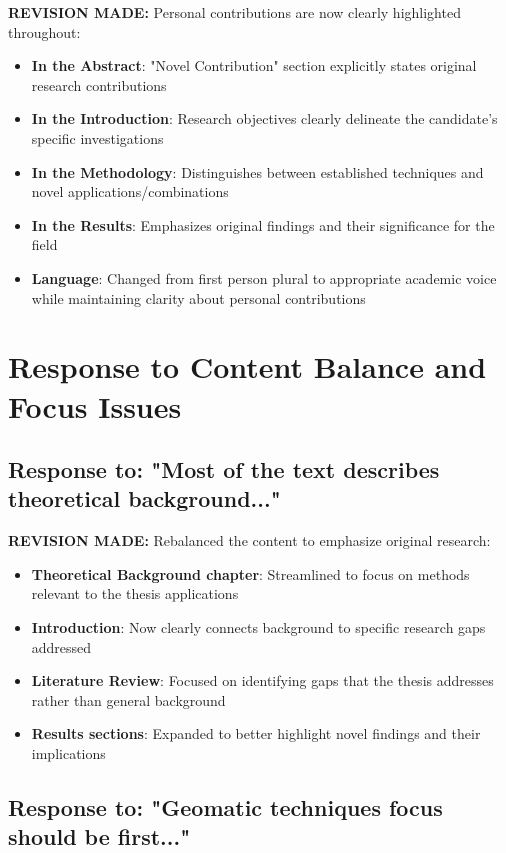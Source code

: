 \documentclass[11pt,a4paper]{article}
\begin{document}
\textbf{REVISION MADE:} Personal contributions are now clearly highlighted throughout:
\begin{itemize}
\item \textbf{In the Abstract}: "Novel Contribution" section explicitly states original research contributions
\item \textbf{In the Introduction}: Research objectives clearly delineate the candidate's specific investigations
\item \textbf{In the Methodology}: Distinguishes between established techniques and novel applications/combinations
\item \textbf{In the Results}: Emphasizes original findings and their significance for the field
\item \textbf{Language}: Changed from first person plural to appropriate academic voice while maintaining clarity about personal contributions
\end{itemize}

\section{Response to Content Balance and Focus Issues}

\subsection{Response to: "Most of the text describes theoretical background..."}

\textbf{REVISION MADE:} Rebalanced the content to emphasize original research:
\begin{itemize}
\item \textbf{Theoretical Background chapter}: Streamlined to focus on methods relevant to the thesis applications
\item \textbf{Introduction}: Now clearly connects background to specific research gaps addressed
\item \textbf{Literature Review}: Focused on identifying gaps that the thesis addresses rather than general background
\item \textbf{Results sections}: Expanded to better highlight novel findings and their implications
\end{itemize}

\subsection{Response to: "Geomatic techniques focus should be first..."}
\end{document}
